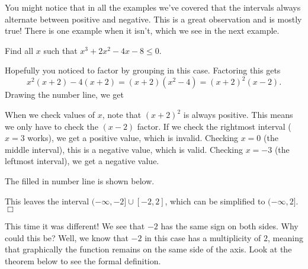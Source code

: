 \documentclass[lang=en,11pt]{elegantbook}
\begin{document}
You might notice that in all the examples we've covered that the intervals always alternate between positive and negative.  This is a great observation and is mostly true! There is one example when it isn't, which we see in the next example.
\begin{example}
Find all $x$ such that $x^3+2x^2-4x-8\leq 0$.
\end{example}
\begin{solution}
Hopefully you noticed to factor by grouping in this case.  Factoring this gets $$x^2(x+2)-4(x+2)=(x+2)(x^2-4)=(x+2)^2(x-2).$$  Drawing the number line, we get
\begin{figure}[!h]
    \centering
\end{figure}

When we check values of $x$, note that $(x+2)^2$ is always positive.  This means we only have to check the $(x-2)$ factor.  If we check the rightmost interval ($x=3$ works), we get a positive value, which is invalid.  Checking $x=0$ (the middle interval), this is a negative value, which is valid.  Checking $x=-3$ (the leftmost interval), we get a negative value.

The filled in number line is shown below.
\begin{figure}[!h]
    \centering
\end{figure}

This leaves the interval $(-\infty,-2]\cup[-2,2]$, which can be simplified to $(-\infty,2]$. $\Box$
\end{solution}
This time it was different! We see that $-2$ has the same sign on both sides.  Why could this be?  Well, we know that $-2$ in this case has a multiplicity of $2$, meaning that graphically the function remains on the same side of the axis.  Look at the theorem below to see the formal definition.
\end{document}
